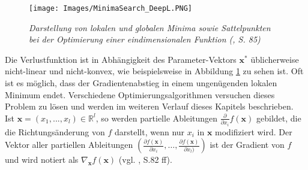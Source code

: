 \documentclass[a4paper,11pt]{article}
\begin{document}
\begin{figure}[!ht]
\begin{center}
\texttt{[image: Images/MinimaSearch\_DeepL.PNG]}
\caption{\textit{Darstellung von lokalen und globalen Minima sowie Sattelpunkten bei der Optimierung einer eindimensionalen Funktion (\cite{deepL}, S. 85)}}
\label{abb:MinimaSearch}
\end{center}
\end{figure}

Die Verlustfunktion ist in Abhängigkeit des Parameter-Vektors $\bm{x}^\ast$ üblicherweise nicht-linear und nicht-konvex, wie beispielsweise in Abbildung \ref{abb:MinimaSearch} zu sehen ist. Oft ist es möglich, dass der Gradientenabstieg in einem ungenügenden lokalen Minimum endet. Verschiedene Optimierungsalgorithmen versuchen dieses Problem zu lösen und werden im weiteren Verlauf dieses Kapitels beschrieben.\\

Ist $\bm{x} = (x_1, ..., x_l) \in \mathbb{R}^l$, so werden partielle Ableitungen $\frac{\partial}{\partial x_i} f(\bm{x})$ gebildet, die die Richtungsänderung von $f$ darstellt, wenn nur $x_i$ in $\bm{x}$ modifiziert wird. Der Vektor aller partiellen Ableitungen $(\frac{\partial f(\bm{x})}{\partial x_i}, \dots, \frac{\partial f(\bm{x})}{\partial x_l)})$ ist der Gradient von $f$ und wird notiert als $\nabla_{\bm{x}} f(\bm{x})$ (vgl. \cite{deepL}, S.82 ff).\\
\end{document}

